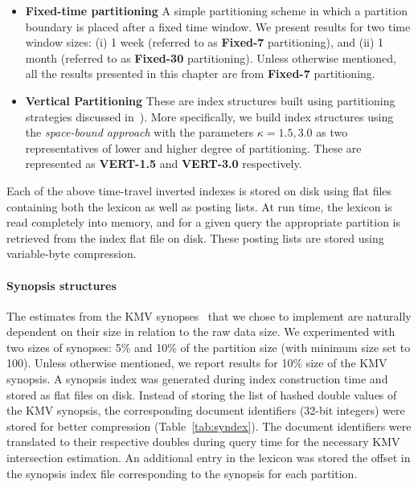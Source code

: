 \begin{itemize}
  \item \textbf{Fixed-time partitioning} A simple partitioning scheme in which a partition boundary is placed after a fixed time window. We present results for two time window sizes: (i) 1 week (referred to as
{\bf Fixed-7} partitioning), and (ii) 1 month (referred to as {\bf
  Fixed-30} partitioning). Unless otherwise mentioned, all the results
presented in this chapter are from {\bf Fixed-7} partitioning.

\item {\bf Vertical Partitioning} These are index structures built using partitioning strategies discussed in~\cite{kberberi:sigir2007}). More specifically, we build index structures using the \emph{space-bound approach} with the parameters $\kappa=1.5 , 3.0$ as two representatives of lower and higher degree of partitioning. These are represented as {\bf VERT-1.5} and {\bf VERT-3.0} respectively.

\end{itemize}

Each of the above time-travel inverted indexes is stored on disk using flat files containing both the lexicon as well as posting lists. At run time, the lexicon is read completely into memory, and for a given query the
appropriate partition is retrieved from the index flat file on
disk. These posting lists are stored using variable-byte compression. 

\paragraph{Synopsis structures} The estimates from the KMV synopses~\cite{kmv:sigmod} that we
chose to implement are naturally dependent on their size in relation
to the raw data size. We experimented with two sizes of synopses: 5\%
and 10\% of the partition size (with minimum size set to 100). Unless
otherwise mentioned, we report results for 10\% size of the KMV synopsis. A synopsis index was generated during index construction time and stored as flat files on disk. Instead of storing the list of hashed double values of the KMV synopsis, the corresponding document identifiers (32-bit integers) were stored for better compression (Table~\ref{tab:syndex}). The document identifiers were translated to their respective doubles during query time for the necessary KMV intersection estimation. An additional entry in the lexicon was stored the offset in the synopsis index file corresponding to the synopsis for each partition.

